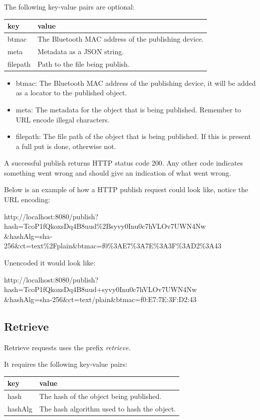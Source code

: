 The following key-value pairs are optional:

\begin{tabular}{ | l | l | }
	\hline
	key & value  \\ \hline \hline
	btmac & The Bluetooth MAC address of the publishing device. \\ \hline
	meta & Metadata as a JSON string. \\ \hline
	filepath & Path to the file being publish. \\ \hline
\end{tabular}

\begin{itemize}
	\item btmac: The Bluetooth MAC address of the publishing device, it will be added as a locator to the published object.
	\item meta: The metadata for the object that is being published. Remember to URL encode illegal characters.
	\item filepath: The file path of the object that is being published. If this is present a full put is done, otherwise not.
 \end{itemize}

A successful publish returns HTTP status code 200. Any other code indicates something went wrong and should give an indication of what went wrong.

Below is an example of how a HTTP publish request could look like, notice the URL encoding:

http://localhost:8080/publish?hash=TcoP1fQkoxsDq4B8uud\%2Bsyvy0Inu0c7hVLOv7UWN4Nw \\ \&hashAlg=sha-256\&ct=text\%2Fplain\&btmac=f0\%3AE7\%3A7E\%3A3F\%3AD2\%3A43

Unencoded it would look like:

http://localhost:8080/publish?hash=TcoP1fQkoxsDq4B8uud+syvy0Inu0c7hVLOv7UWN4Nw \\ \&hashAlg=sha-256\&ct=text/plain\&btmac=f0:E7:7E:3F:D2:43

\subsection{Retrieve}

Retrieve requests uses the prefix \emph{retrieve}.

It requires the following key-value pairs:

\begin{tabular}{ | l | l | }
	\hline
	key & value  \\ \hline \hline
	hash & The hash of the object being published.  \\ \hline
	hashAlg & The hash algorithm used to hash the object. \\ \hline
\end{tabular}

